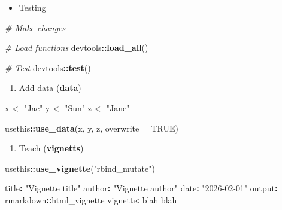 \documentclass[
]{book}
\newenvironment{Shaded}{\begin{snugshade}}{\end{snugshade}}
\newcommand{\AttributeTok}[1]{\textcolor[rgb]{0.13,0.29,0.53}{#1}}
\newcommand{\CommentTok}[1]{\textcolor[rgb]{0.56,0.35,0.01}{\textit{#1}}}
\newcommand{\ConstantTok}[1]{\textcolor[rgb]{0.56,0.35,0.01}{#1}}
\newcommand{\FunctionTok}[1]{\textcolor[rgb]{0.13,0.29,0.53}{\textbf{#1}}}
\newcommand{\NormalTok}[1]{#1}
\newcommand{\OtherTok}[1]{\textcolor[rgb]{0.56,0.35,0.01}{#1}}
\newcommand{\SpecialCharTok}[1]{\textcolor[rgb]{0.81,0.36,0.00}{\textbf{#1}}}
\newcommand{\StringTok}[1]{\textcolor[rgb]{0.31,0.60,0.02}{#1}}
\providecommand{\tightlist}{%
  \setlength{\itemsep}{0pt}\setlength{\parskip}{0pt}}
\begin{document}
\begin{itemize}
\tightlist
\item
  Testing
\end{itemize}

\begin{Shaded}
\begin{Highlighting}[]
\CommentTok{\# Make changes }

\CommentTok{\# Load functions }
\NormalTok{devtools}\SpecialCharTok{::}\FunctionTok{load\_all}\NormalTok{()}

\CommentTok{\# Test }
\NormalTok{devtools}\SpecialCharTok{::}\FunctionTok{test}\NormalTok{()}
\end{Highlighting}
\end{Shaded}

\begin{enumerate}
\def\labelenumi{\arabic{enumi}.}
\setcounter{enumi}{1}
\tightlist
\item
  Add data (\textbf{data})
\end{enumerate}

\begin{Shaded}
\begin{Highlighting}[]
\NormalTok{x }\OtherTok{\textless{}{-}} \StringTok{"Jae"}
\NormalTok{y }\OtherTok{\textless{}{-}} \StringTok{"Sun"}
\NormalTok{z }\OtherTok{\textless{}{-}} \StringTok{"Jane"}

\NormalTok{usethis}\SpecialCharTok{::}\FunctionTok{use\_data}\NormalTok{(x, y, z, }\AttributeTok{overwrite =} \ConstantTok{TRUE}\NormalTok{)}
\end{Highlighting}
\end{Shaded}

\begin{enumerate}
\def\labelenumi{\arabic{enumi}.}
\setcounter{enumi}{2}
\tightlist
\item
  Teach (\textbf{vignetts})
\end{enumerate}

\begin{Shaded}
\begin{Highlighting}[]
\NormalTok{usethis}\SpecialCharTok{::}\FunctionTok{use\_vignette}\NormalTok{(}\StringTok{"rbind\_mutate"}\NormalTok{)}
\end{Highlighting}
\end{Shaded}

\begin{Shaded}
\begin{Highlighting}[]
\NormalTok{title}\SpecialCharTok{:} \StringTok{"Vignette title"}
\NormalTok{author}\SpecialCharTok{:} \StringTok{"Vignette author"}
\NormalTok{date}\SpecialCharTok{:} \StringTok{"2026{-}02{-}01"}
\NormalTok{output}\SpecialCharTok{:}\NormalTok{ rmarkdown}\SpecialCharTok{::}\NormalTok{html\_vignette}
\NormalTok{vignette}\SpecialCharTok{:}\NormalTok{ blah blah}
\end{Highlighting}
\end{Shaded}
\end{document}
